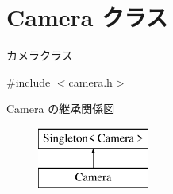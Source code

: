 \hypertarget{class_camera}{}\section{Camera クラス}
\label{class_camera}


カメラクラス  




{\ttfamily \#include $<$camera.\+h$>$}

Camera の継承関係図\begin{figure}[H]
\begin{center}
\leavevmode
\includegraphics[height=2.000000cm]{class_camera}
\end{center}
\end{figure}
